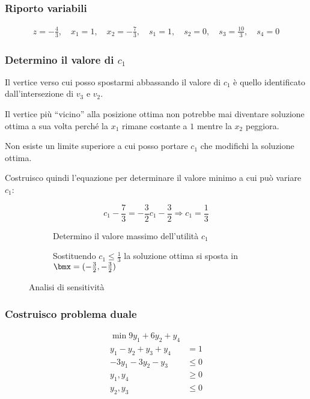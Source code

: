 \documentclass[\main/main.tex]{subfiles}
\begin{document}
\subsubsection*{Riporto variabili}

\begin{align*}
  z   = -\frac{4}{3},\quad
  x_1 = 1           ,\quad
  x_2 = -\frac{7}{3},\quad
  s_1 = 1           ,\quad
  s_2 = 0           ,\quad
  s_3 = \frac{10}{3},\quad
  s_4 = 0
\end{align*}
\subsubsection*{Determino il valore di $c_1$}
Il vertice verso cui posso spostarmi abbassando il valore di $c_1$ è quello identificato dall'intersezione di $v_3$ e $v_2$.

Il vertice più ``vicino'' alla posizione ottima non potrebbe mai diventare soluzione ottima a sua volta perché la $x_1$ rimane costante a $1$ mentre la $x_2$ peggiora.

Non esiste un limite superiore a cui posso portare $c_1$ che modifichi la soluzione ottima.

Costruisco quindi l'equazione per determinare il valore minimo a cui può variare $c_1$:

\begin{figure}
  \begin{subfigure}{0.49\textwidth}
    \[
      c_1 -\frac{7}{3} = -\frac{3}{2}c_1 - \frac{3}{2} \Rightarrow c_1 = \frac{1}{3}
    \]
    \caption{Determino il valore massimo dell'utilità $c_1$}
  \end{subfigure}
  \begin{subfigure}{0.49\textwidth}
    \caption{Sostituendo $c_1\leq\frac{1}{3}$ la soluzione ottima si sposta in $\bmx=(-\frac{3}{2},-\frac{3}{2})$}
  \end{subfigure}
  \caption{Analisi di sensitività}
\end{figure}

\subsubsection*{Costruisco problema duale}
\begin{align*}
  \min 9y_1 + 6y_2 + y_4       \\
  y_1 -y_2 + y_3 +y_4 & = 1    \\
  -3y_1 - 3y_2 -y_3   & \leq 0 \\
  y_1, y_4            & \geq 0 \\
  y_2, y_3            & \leq 0 \\
\end{align*}
\end{document}
